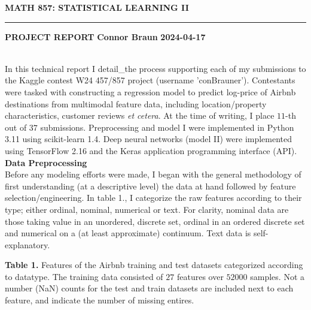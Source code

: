 \documentclass[11pt]{article}
\newcommand{\1}[1]{\mathbbm{1}_{#1}}
\begin{document}
    \begin{center}
        {\bf\large{MATH 857: STATISTICAL LEARNING II}}
        \smallskip
        \hrule
        \smallskip
        {\bf PROJECT REPORT} \hfill {\bf Connor Braun} \hfill {\bf 2024-04-17}
    \end{center}
\\[5pt]
In this technical report I detail\_the process supporting each of my submissions to the Kaggle contest W24 457/857 project
(username 'conBrauner'). Contestants were tasked with constructing a regression model to predict log-price of Airbnb destinations
from multimodal feature data, including location/property characteristics, customer reviews {\it et cetera}. At the time of writing,
I place $11$-th out of $37$ submissions. Preprocessing and model I were implemented in Python 3.11 using scikit-learn 1.4. Deep neural networks (model II)
were implemented using TensorFlow 2.16 and the Keras application programming interface (API).\\[5pt]
{\bf\large Data Preprocessing}\\[5pt]
Before any modeling efforts were made, I began with the general methodology of first understanding (at a descriptive level) the data at hand followed by feature selection/engineering. In table 1., I categorize the raw features according
to their type; either ordinal, nominal, numerical or text. For clarity, nominal data are those taking value in an unordered, discrete set,
ordinal in an ordered discrete set and numerical on a (at least approximate) continuum. Text data is self-explanatory.
\begin{center}
    \begin{minipage}{\dimexpr\paperwidth-5cm}
        {\bf Table 1.} Features of the Airbnb training and test datasets categorized according to datatype. The training data consisted of $27$
        features over $52000$ samples. Not a number (NaN) counts for the test and train datasets are included next to each feature, and indicate the number of missing entires.
    \end{minipage}
\end{center}
\end{document}
